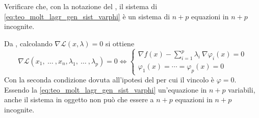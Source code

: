 \begin{exercise}
	Verificare che, con la notazione del , il sistema di \cref{eq:teo_molt_lagr_gen_sist_varphi} è un sistema di $n + p$ equazioni in $n + p$ incognite.
	\begin{solution}
		Da , calcolando $\nabla \mathcal{L}(x, \lambda) = 0$ si ottiene
		\[
			\nabla \mathcal{L}(x_1,\:\dotsc\:, x_n, \lambda_1,\:\dotsc\:,\lambda_p) = 0
			\iff
			\begin{cases}
				\nabla f(x) - \sum\limits_{i=1}^{p} {\lambda_i \: \nabla \varphi_i (x)} = 0\\
				\varphi_1(x) = \cdots = \varphi_p(x) = 0
			\end{cases}
		\]
		Con la seconda condizione dovuta all'ipotesi del  per cui il vincolo è $\varphi = 0$.\\
		Essendo la \cref{eq:teo_molt_lagr_gen_sist_varphi} un'equazione in $n + p$ variabili, anche il sistema in oggetto non può che essere a $n + p$ equazioni in $n + p$ incognite.
	\end{solution}
\end{exercise}
